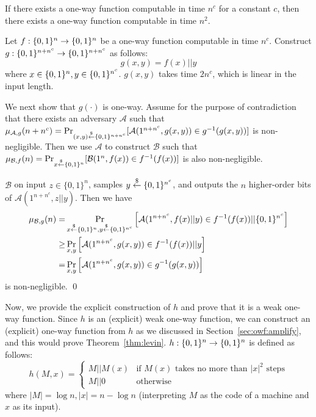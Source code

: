 \documentclass[12pt]{tufte-book}
\begin{document}
\begin{lemma}\label{lem:n2owf}
If there exists a one-way function computable in time $n^c$ for a constant $c$, then there exists a one-way function computable in time $n^2$.
\end{lemma}
\proof
Let $f: \{0,1\}^{n} \rightarrow \{0,1\}^{n}$ be a one-way function computable in time $n^c$.
Construct $g: \{0,1\}^{n+n^c} \rightarrow \{0,1\}^{n+n^c}$ as follows:
$$g(x,y) = f(x) || y$$
where $x \in \{0,1\}^{n}, y \in \{0,1\}^{n^c}$.
$g(x,y)$ takes time $2n^c$, which is linear in the input length.

We next show that $g(\cdot)$ is one-way.
Assume for the purpose of contradiction that there exists an adversary $\mathcal{A}$ such that $\mu_{\mathcal{A},g}(n+n^c) = \Pr_{(x,y) \stackrel{\$}{\leftarrow} \{0,1\}^{n+n^c}}[ \mathcal{A}(1^{n+n^c}, g(x,y)) \in g^{-1}(g(x,y))]$ is non-negligible. Then we use $\mathcal{A}$ to construct $\mathcal{B}$ such that $\mu_{\mathcal{B},f}(n) = \Pr_{x \stackrel{\$}{\leftarrow} \{0,1\}^{n}}[ \mathcal{B}(1^n, f(x)) \in f^{-1}(f(x))]$ is also non-negligible.

$\mathcal{B}$ on input $z \in\{0,1\}^n$, samples $y \stackrel{\$}{\leftarrow} \{0,1\}^{n^c}$, and outputs the $n$ higher-order bits of  $\mathcal{A}(1^{n+n^c}, z||y)$. Then we have
\begin{align*}
\mu_{\mathcal{B},g}(n) =& \Pr_{x \stackrel{\$}{\leftarrow} \{0,1\}^{n}, y \stackrel{\$}{\leftarrow} \{0,1\}^{n^c}}\left[\mathcal{A}(1^{n+n^c}, f(x) || y) \in f^{-1}(f(x)) || \{0,1\}^{n^c}\right]\\
\geq&\Pr_{x,y}\left[\mathcal{A}(1^{n+n^c}, g(x,y)) \in f^{-1}(f(x)) || y\right]\\
=& \Pr_{x,y}\left[\mathcal{A}(1^{n+n^c}, g(x,y)) \in g^{-1}(g(x,y))\right]
\end{align*}
is non-negligible.
\qed

\bigskip
Now, we provide the explicit construction of $h$ and prove that it is a weak one-way function.
Since $h$ is an (explicit) weak one-way function, we can construct an (explicit) one-way function from $h$ as we discussed in Section~\ref{sec:owf:amplify}, and this would prove Theorem~\ref{thm:levin}.
$h: \{0,1\}^{n} \rightarrow \{0,1\}^{n}$ is defined as follows:
$$
h(M,x) = \left\{
\begin{array}{ll}
M || M(x) & \text{if $M(x)$ takes no more than $|x|^2$ steps} \\
M || 0 & \text{otherwise}
\end{array}
\right.
$$
where $|M| = \log n, |x| = n - \log n$ (interpreting $M$ as the code of a machine  and $x$ as its input).
\end{document}
